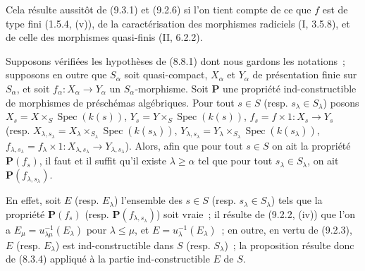 Cela résulte aussitôt de (9.3.1) et (9.2.6) si l'on tient compte de ce que $f$
est de type fini (1.5.4, (v)), de la caractérisation des morphismes radiciels
(I, 3.5.8), et de celle des morphismes quasi-finis (II, 6.2.2).

\begin{proposition}[9.3.3]
\label{IV.9.3.3-fr}
Supposons vérifiées les hypothèses de (8.8.1) dont nous gardons les
notations~; supposons en outre que $S_\alpha$ soit quasi-compact, $X_\alpha$
et $Y_\alpha$ de présentation finie sur $S_\alpha$, et soit
$f_\alpha:X_\alpha\to Y_\alpha$ un $S_\alpha$-morphisme. Soit $\mathbf P$ une
propriété ind-constructible de morphismes de préschémas algébriques. Pour tout
$s\in S$ (resp. $s_\lambda\in S_\lambda$) posons
$X_s=X\times_S\operatorname{Spec}(k(s))$,
$Y_s=Y\times_S\operatorname{Spec}(k(s))$,
$f_s=f\times1:X_s\to Y_s$ (resp.
$X_{\lambda,s_\lambda}=X_\lambda\times_{S_\lambda}
\operatorname{Spec}(k(s_\lambda))$,
$Y_{\lambda,s_\lambda}=Y_\lambda\times_{S_\lambda}
\operatorname{Spec}(k(s_\lambda))$,
$f_{\lambda,s_\lambda}=f_\lambda\times1:
X_{\lambda,s_\lambda}\to Y_{\lambda,s_\lambda}$). Alors, afin que pour
tout $s\in S$ on ait la propriété $\mathbf P(f_s)$, il faut et il suffit
qu'il existe $\lambda\geqslant\alpha$ tel que pour tout
$s_\lambda\in S_\lambda$, on ait $\mathbf P(f_{\lambda,s_\lambda})$.
\end{proposition}

En effet, soit $E$ (resp. $E_\lambda$) l'ensemble des $s\in S$ (resp.
$s_\lambda\in S_\lambda$) tels que la propriété $\mathbf P(f_s)$ (resp.
$\mathbf P(f_{\lambda,s_\lambda})$) soit vraie~; il résulte de
(9.2.2, (iv)) que l'on a
$E_\mu=u_{\lambda\mu}^{-1}(E_\lambda)$ pour $\lambda\leqslant\mu$, et
$E=u_\lambda^{-1}(E_\lambda)$~; en outre, en vertu de (9.2.3), $E$ (resp.
$E_\lambda$) est ind-constructible dans $S$ (resp. $S_\lambda$)~; la
proposition résulte donc de (8.3.4) appliqué à la partie ind-constructible
$E$ de $S$.

